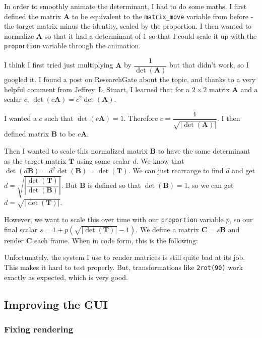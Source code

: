 \documentclass[../main.tex]{subfiles}
\begin{document}
In order to smoothly animate the determinant, I had to do some maths. I first defined the matrix $\mathbf{A}$ to be equivalent to the \texttt{matrix\_move} variable from before - the target matrix minus the identity, scaled by the proportion. I then wanted to normalize $\mathbf{A}$ so that it had a determinant of 1 so that I could scale it up with the \texttt{proportion} variable through the animation.

I think I first tried just multiplying $\mathbf{A}$ by $\dfrac{1}{\det(\mathbf{A})}$ but that didn't work, so I googled it. I found a post\cite{researchgate-normalize-determinant} on ResearchGate about the topic, and thanks to a very helpful comment from Jeffrey~L~Stuart, I learned that for a $2 \times 2$ matrix $\mathbf{A}$ and a scalar $c$, $\det(c \mathbf{A}) = c^2 \det(\mathbf{A})$.

I wanted a $c$ such that $\det(c \mathbf{A}) = 1$. Therefore $c = \dfrac{1}{\sqrt{|\det(\mathbf{A})|}}$. I then defined matrix $\mathbf{B}$ to be $c\mathbf{A}$.

Then I wanted to scale this normalized matrix $\mathbf{B}$ to have the same determinant as the target matrix $\mathbf{T}$ using some scalar $d$. We know that $\det(d \mathbf{B}) = d^2 \det(\mathbf{B}) = \det(\mathbf{T})$. We can just rearrange to find $d$ and get $d = \sqrt{\left|\dfrac{\det(\mathbf{T})}{\det(\mathbf{B})}\right|}$. But $\mathbf{B}$ is defined so that $\det(\mathbf{B}) = 1$, so we can get $d = \sqrt{|\det(\mathbf{T})|}$.

However, we want to scale this over time with our \texttt{proportion} variable $p$, so our final scalar $s = 1 + p \left(\sqrt{|\det(\mathbf{T})|} - 1\right)$. We define a matrix $\mathbf{C} = s \mathbf{B}$ and render $\mathbf{C}$ each frame. When in code form, this is the following:


Unfortunately, the system I use to render matrices is still quite bad at its job. This makes it hard to test properly. But, transformations like \texttt{2rot(90)} work exactly as expected, which is very good.

\subsection{Improving the GUI\label{development:improving-the-gui}}

\subsubsection{Fixing rendering\label{development:improving-the-gui:fixing-rendering}}
\end{document}
